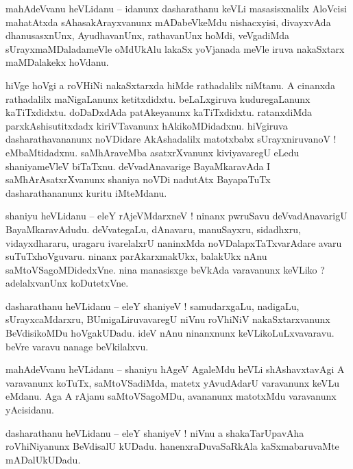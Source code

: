 \documentclass{article}
\begin{document}
\begin{mn}%
mahAdeVvanu heVLidanu -- idanunx dasharathanu keVLi masasisxnalilx AloVcisi mahatAtxda 
sAhasakArayxvanunx mADabeVkeMdu nishacxyisi, divayxvAda dhanusasxnUnx, AyudhavanUnx, rathavanUnx 
hoMdi, veVgadiMda sUrayxmaMDaladameVle oMdUkAlu lakaSx yoVjanada meVle iruva nakaSxtarx 
maMDalakekx hoVdanu.
\end{mn}

\begin{mn}%
hiVge hoVgi a roVHiNi nakaSxtarxda hiMde rathadalilx niMtanu. A cinanxda rathadalilx maNigaLanunx 
ketitxdidxtu. beLaLxgiruva kuduregaLanunx kaTiTxdidxtu. doDaDxdAda patAkeyanunx kaTiTxdidxtu. 
ratanxdiMda parxkAshisutitxdadx kiriVTavanunx hAkikoMDidadxnu. hiVgiruva dasharathavananunx 
noVDidare AkAshadalilx matotxbabx sUrayxniruvanoV ! eMbaMtidadxnu. saMhAraveMba asatxrXvanunx 
kiviyavaregU eLedu shaniyameVleV biTaTxnu. deVvadAnavarige BayaMkaravAda I saMhArAsatxrXvanunx 
shaniya noVDi nadutAtx BayapaTuTx dasharathananunx kuritu iMteMdanu.
\end{mn}

\begin{mn}%
shaniyu heVLidanu -- eleY rAjeVMdarxneV ! ninanx pwruSavu deVvadAnavarigU BayaMkaravAdudu. 
deVvategaLu, dAnavaru, manuSayxru, sidadhxru, vidayxdhararu, uragaru ivarelalxrU naninxMda 
noVDalapxTaTxvarAdare avaru suTuTxhoVguvaru. ninanx parAkarxmakUkx, balakUkx nAnu 
saMtoVSagoMDidedxVne. nina manasisxge beVkAda varavanunx keVLiko ? adelalxvanUnx koDutetxVne.
\end{mn}

\begin{mn}%
dasharathanu heVLidanu -- eleY shaniyeV ! samudarxgaLu, nadigaLu, sUrayxcaMdarxru, 
BUmigaLiruvavaregU niVnu roVhiNiV nakaSxtarxvanunx BeVdisikoMDu hoVgakUDadu. ideV nAnu ninanxnunx 
keVLikoLuLxvavaravu. beVre varavu nanage beVkilalxvu.
\end{mn}

\begin{mn}%
mahAdeVvanu heVLidanu -- shaniyu hAgeV AgaleMdu heVLi shAshavxtavAgi A varavanunx koTuTx, 
saMtoVSadiMda, matetx yAvudAdarU varavanunx keVLu eMdanu. Aga A rAjanu saMtoVSagoMDu, avananunx 
matotxMdu varavanunx yAcisidanu.
\end{mn}

\begin{mn}%
dasharathanu heVLidanu -- eleY shaniyeV ! niVnu a shakaTarUpavAha roVhiNiyanunx BeVdisalU kUDadu. 
hanenxraDuvaSaRkAla kaSxmabaruvaMte mADalUkUDadu.
\end{mn}
\end{document}
